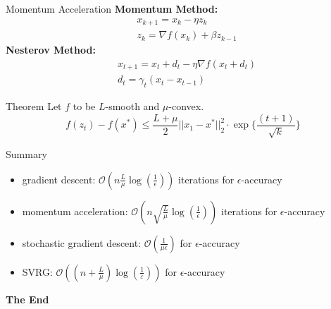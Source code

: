 \documentclass[aspectratio=169,xcolor=dvipsnames]{beamer}
\begin{document}
\begin{frame}{Momentum Acceleration}
\textbf{Momentum Method:}
	\begin{align*}
		&x_{k+1} = x_k - \eta z_k\\
		&z_k = \nabla f(x_k) + \beta z_{k-1}
	\end{align*}
\textbf{Nesterov Method:}
\begin{align*}
	&x_{t+1} = x_t + d_t - \eta \nabla f(x_t + d_t)\\
	&d_t = \gamma_t (x_t - x_{t-1})
\end{align*}

\begin{block}{Theorem}
Let $f$ to be $L$-smooth and $\mu$-convex.
\begin{equation*}
	f(z_t) - f(x^*) \le \frac{L + \mu}{2} ||x_1 -x^* ||_2^2\cdot \exp\{ \frac{(t+1)}{\sqrt{k}} \}
\end{equation*}
	
\end{block}

\end{frame}





\begin{frame}{Summary}

\begin{itemize}
	\item gradient descent: $\mathcal O(n\frac{L}{\mu} \log(\frac{1}{\epsilon}))$ iterations for $\epsilon$-accuracy 
	\item momentum acceleration: $\mathcal O(n\sqrt{\frac{L}{\mu} }\log(\frac{1}{\epsilon}))$ iterations for $\epsilon$-accuracy 
	\item stochastic gradient descent: $\mathcal O(\frac{1}{\mu\epsilon})$ for $\epsilon$-accuracy
	\item SVRG: $\mathcal O((n + \frac{L}{\mu})\log(\frac{1}{\varepsilon}))$ for $\epsilon$-accuracy
\end{itemize}


	
\end{frame}




\begin{frame}
    \Huge{\centerline{\textbf{The End}}}
\end{frame}

\end{document}
